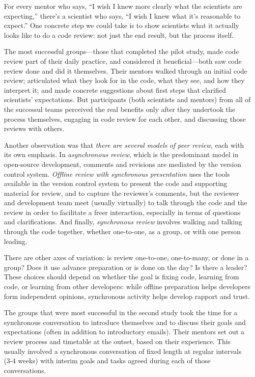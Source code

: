 \documentclass[10pt,twocolumn]{article}
\begin{document}
For every mentor who says,
``I wish I knew more clearly what the scientists are expecting,''
there's a scientist who says,
``I wish I knew what it's reasonable to expect.''
One concrete step we could take is to show scientists what it actually looks like to do a code review:
not just the end result, but the process itself.

The most successful groups---those that completed the pilot study,
made code review part of their daily practice,
and considered it beneficial---both saw code review done and did it themselves.
Their mentors walked through an initial code review;
articulated what they look for in the code, what they see, and how they interpret it;
and made concrete suggestions about first steps that clarified scientists' expectations.
But participants (both scientists and mentors) from all of the successul teams
perceived the real benefits only after they undertook the process themselves,
engaging in code review for each other,
and discussing those reviews with others.

Another observation was that \emph{there are several models of peer review},
each with its own emphasis.
In \emph{asynchronous review},
which is the predominant model in open-source development,
comments and revisions are mediated by the version control system.
\emph{Offline review with synchronous presentation}
uses the tools available in the version control system to present the code and supporting material for review,
and to capture the reviewer's comments,
but the reviewer and development team meet (usually virtually) to talk through the code and the review
in order to facilitate a freer interaction,
especially in terms of questions and clarifications.
And finally,
\emph{synchronous review}
involves walking and talking through the code together,
whether one-to-one, as a group, or with one person leading.

There are other axes of variation:
is review one-to-one, one-to-many, or done in a group?
Does it use advance preparation or is done on the day?
Is there a leader?
These choices should depend on whether the goal is
fixing code, learning from code, or learning from other developers:
while offline preparation helps developers form independent opinions,
synchronous activity helps develop rapport and trust.

The groups that were most successful in the second study
took the time for a synchronous conversation to introduce themselves and to discuss their goals and expectations
(often in addition to introductory emails).
Their mentors set out a review process and timetable at the outset,
based on their experience.
This usually involved a synchronous conversation of fixed length at regular intervals (3-4 weeks)
with interim goals and tasks agreed during each of those conversations.
\end{document}
